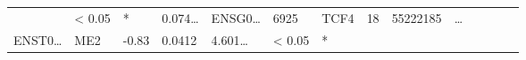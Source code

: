 \documentclass[
]{article}
\begin{document}
\begin{longtable}[]{@{}llllllllllllll@{}}
\begin{minipage}[t]{0.05\columnwidth}
\end{minipage} & \begin{minipage}[t]{0.05\columnwidth}\raggedright
\textless{} 0.05\strut
\end{minipage} & \begin{minipage}[t]{0.03\columnwidth}\raggedright
*\strut
\end{minipage} & \begin{minipage}[t]{0.05\columnwidth}\raggedright
0.074\ldots{}\strut
\end{minipage} & \begin{minipage}[t]{0.05\columnwidth}\raggedright
ENSG0\ldots{}\strut
\end{minipage} & \begin{minipage}[t]{0.05\columnwidth}\raggedright
6925\strut
\end{minipage} & \begin{minipage}[t]{0.05\columnwidth}\raggedright
TCF4\strut
\end{minipage} & \begin{minipage}[t]{0.05\columnwidth}\raggedright
18\strut
\end{minipage} & \begin{minipage}[t]{0.05\columnwidth}\raggedright
55222185\strut
\end{minipage} & \begin{minipage}[t]{0.02\columnwidth}\raggedright
\ldots{}\strut
\end{minipage}\tabularnewline
\begin{minipage}[t]{0.05\columnwidth}\raggedright
ENST0\ldots{}\strut
\end{minipage} & \begin{minipage}[t]{0.04\columnwidth}\raggedright
ME2\strut
\end{minipage} & \begin{minipage}[t]{0.04\columnwidth}\raggedright
-0.83\strut
\end{minipage} & \begin{minipage}[t]{0.04\columnwidth}\raggedright
0.0412\strut
\end{minipage} & \begin{minipage}[t]{0.05\columnwidth}\raggedright
4.601\ldots{}\strut
\end{minipage} & \begin{minipage}[t]{0.05\columnwidth}\raggedright
\textless{} 0.05\strut
\end{minipage} & \begin{minipage}[t]{0.03\columnwidth}\raggedright
*\strut

\end{minipage}
\end{longtable}
\end{document}
